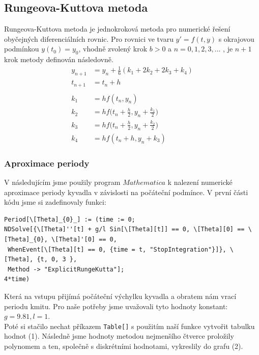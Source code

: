 \documentclass[reqno, a4paper]{amsart}
\begin{document}
\clearpage
\subsection{Rungeova-Kuttova metoda}
\label{sec:Rungeova-Kuttova metoda}

Rungeova-Kuttova metoda je jednokroková metoda pro numerické řešení obyčejných diferenciálních rovnic. Pro rovnici ve tvaru \( y'= f(t,y)\) s okrajovou podmínkou \(y(t_0)=y_0 \), vhodně zvolený krok \(b>0\) a \(n = 0, 1, 2, 3, ...\) , je $n+1$ krok metody definován následovně.
\begin{align*}
y_{n+1} &= y_n + \frac{1}{6} (k_1 + 2k_2 +2k_3 +k_4) \\
t_{n+1} &= t_n +h \\ \\
k_1 &= h f(t_n,y_n) \\
k_2 &= h f\Big(t_n + \frac{h}{2},y_n + \frac{k_1}{2}\Big) \\
k_3 &= h f\Big(t_n + \frac{h}{2},y_n + \frac{k_2}{2}\Big) \\
k_4 &= h f(t_n + h ,y_n + k_3) 
\end{align*}

\subsubsection{Aproximace periody}
\label{sec:aprox-periody}
V následujícím jsme použily program $Mathematica$ k nalezení numerické aproximace periody kyvadla v závislosti na počáteční podmínce.
V první části kódu jsme si zadefinovaly funkci:
\begin{verbatim}
Period[\[Theta]_{0}_] := (time := 0; 
NDSolve[{\[Theta]''[t] + g/l Sin[\[Theta][t]] == 0, \[Theta][0] == \[Theta]_{0}, \[Theta]'[0] == 0, 
 WhenEvent[\[Theta][t] == 0, {time = t, "StopIntegration"}]}, \[Theta], {t, 0, 3 },
 Method -> "ExplicitRungeKutta"];
4*time)
\end{verbatim}
Která na vstupu přijímá počáteční výchylku kyvadla a obratem nám vrací periodu kmitu. Pro naše potřeby jsme uvažovali tyto hodnoty konstant: $g=9.81, l=1$.\\
Poté si stačilo nechat příkazem \verb|Table[]| s použitím naší funkce vytvořit tabulku hodnot (1). Následně jsme hodnoty metodou nejmenšího čtverce proložily polynomem a ten, společně s diskrétními hodnotami, vykreslily do grafu (2). 
\end{document}
